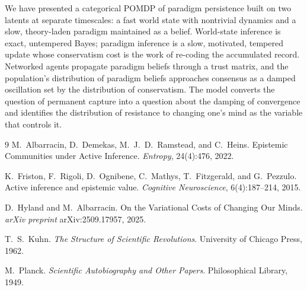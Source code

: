 \documentclass[11pt,a4paper]{article}
\begin{document}
We have presented a categorical POMDP of paradigm persistence built on two latents
at separate timescales: a fast world state with nontrivial dynamics and a slow,
theory-laden paradigm maintained as a belief. World-state inference is exact,
untempered Bayes; paradigm inference is a slow, motivated, tempered update whose
conservatism cost is the work of re-coding the accumulated record. Networked agents propagate
paradigm beliefs through a trust matrix, and the population's distribution of
paradigm beliefs approaches consensus as a damped oscillation set by the
distribution of conservatism. The model converts the question of permanent capture
into a question about the damping of convergence and identifies the distribution of
resistance to changing one's mind as the variable that controls it.

\begin{thebibliography}{9}
M.~Albarracin, D.~Demekas, M.~J.~D.~Ramstead, and C.~Heins.
\newblock Epistemic Communities under Active Inference.
\newblock \emph{Entropy}, 24(4):476, 2022.

K.~Friston, F.~Rigoli, D.~Ognibene, C.~Mathys, T.~Fitzgerald, and G.~Pezzulo.
\newblock Active inference and epistemic value.
\newblock \emph{Cognitive Neuroscience}, 6(4):187--214, 2015.

D.~Hyland and M.~Albarracin.
\newblock On the Variational Costs of Changing Our Minds.
\newblock \emph{arXiv preprint} arXiv:2509.17957, 2025.

T.~S.~Kuhn.
\newblock \emph{The Structure of Scientific Revolutions}.
\newblock University of Chicago Press, 1962.

M.~Planck.
\newblock \emph{Scientific Autobiography and Other Papers}.
\newblock Philosophical Library, 1949.
\end{thebibliography}
\end{document}

